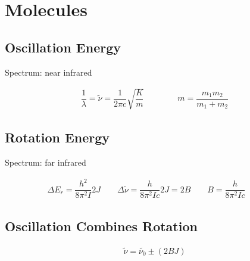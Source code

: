 \chapter{Molecules}

\section{Oscillation Energy}

Spectrum: near infrared

\begin{equation*}
  \begin{aligned}
    \dfrac{1}{\lambda} = \tilde{\nu} = \dfrac{1}{2 \pi c } \sqrt{\dfrac{K}{m} }
    \quad\quad \quad\quad
    m = \dfrac{m_1m_2}{m_1 + m_2} 
  \end{aligned}
\end{equation*}

\section{Rotation Energy}

Spectrum: far infrared

\begin{equation*}
  \begin{aligned}
    \Delta E_r = \dfrac{h^2}{8 \pi^2 I} 2J
    \quad\quad
    \Delta \tilde{\nu} = \dfrac{h}{8 \pi^2 I c}2J = 2 B 
    \quad\quad
    B = \dfrac{h}{8 \pi^2 I c} 
    \quad\quad 
  \end{aligned}
\end{equation*}

\section{Oscillation Combines Rotation}

\begin{equation*}
  \begin{aligned}
    \tilde{\nu} = \tilde{\nu_0} \pm \left( 2 B J \right)
  \end{aligned}
\end{equation*}




